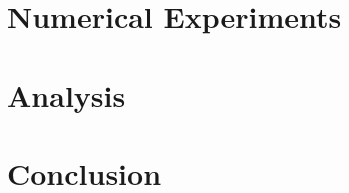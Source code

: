 \documentclass[11pt]{article}
\begin{document}
\section{Numerical Experiments}
\label{sec:numExperiments}


\section{Analysis}
\label{sec:analysis}


\section{Conclusion}
\label{sec:conclusion}





\end{document}
